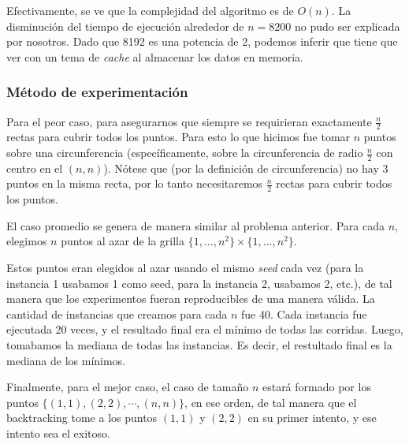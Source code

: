 Efectivamente, se ve que la complejidad del algoritmo es de $O(n)$. La disminución del tiempo de ejecución alrededor de $n = 8200$ no pudo ser explicada por nosotros. Dado que 8192 es una potencia de 2, podemos inferir que tiene que ver con un tema de \emph{cache} al almacenar los datos en memoria.

\subsubsection{M\'etodo de experimentación}

Para el peor caso, para asegurarnos que siempre se requirieran exactamente $\frac{n}{2}$ rectas para cubrir todos los puntos. Para esto lo que hicimos fue tomar $n$ puntos sobre una circunferencia (específicamente, sobre la circunferencia de radio $\frac{n}{2}$ con centro en el $(n,n)$). Nótese que (por la definición de circunferencia) no hay 3 puntos en la misma recta, por lo tanto necesitaremos $\frac{n}{2}$ rectas para cubrir todos los puntos.

El caso promedio se genera de manera similar al problema anterior. Para cada $n$, elegimos $n$ puntos al azar de la grilla $\{1,..., n^2\} \times \{1, ... , n^2\}$.

Estos puntos eran elegidos al azar usando el mismo \emph{seed} cada vez (para la instancia 1 usabamos 1 como seed, para la instancia 2, usabamos 2, etc.), de tal manera que los experimentos fueran reproducibles de una manera válida.
La cantidad de instancias que creamos para cada $n$ fue 40.
Cada instancia fue ejecutada 20 veces, y el resultado final era el mínimo de todas las corridas.
Luego, tomabamos la mediana de todas las instancias. Es decir, el restultado final es la mediana de los mínimos.

Finalmente, para el mejor caso, el caso de tamaño $n$ estará formado por los puntos $\{(1,1), (2,2), \cdots, (n, n)\}$, en ese orden, de tal manera que el backtracking tome a los puntos $(1,1)$ y $(2,2)$ en su primer intento, y ese intento sea el exitoso.

